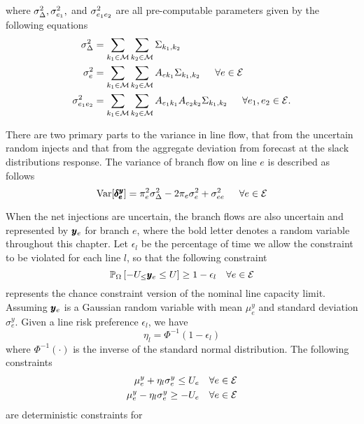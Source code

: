 where  $\sigma_\Delta^2, \sigma_{e_1}^2,$ and $\sigma_{e_1 e_2}^2$ are all pre-computable parameters given by the following equations
\begin{subequations}
\begin{align}
 \sD &= \sko \skt \sigot  \\
 \sigma^2_e &= \sko \skt A_{ek_1} \sigot   \hspace{15px} \forall e \in \cE\\
 \seealone &= \sko \skt A_{e_1 k_1} A_{e_2 k_2} \sigot \hspace{15px} \forall e_1,e_2 \in \cE.
\end{align}
\end{subequations}



There are two primary parts to the variance in line flow, that from the uncertain random injects and that from the aggregate deviation from forecast at the slack distributions response.  The variance of branch flow on line $e$ is described as follows  
\begin{equation}
\operatorname{Var}[ \rdfe ] =  \pi_e^2  \sD  - 2 \pi_e \sigma^2_e  + \sigma^2_{e e}  \hspace{15px} \forall e \in \cE
\end{equation}



When the net injections are uncertain, the branch flows are also uncertain and represented by $\pmb{y}_e$ for branch $e$, where the bold letter denotes a random variable throughout this chapter.  Let $\epsilon_l$ be the percentage of time we allow the constraint to be violated for each line $l$, so that the following constraint 
\begin{equation}\label{eq_cc}
 \bP{\Omega}{  -U_ \leq  \ry_e \leq U } \geq 1- \epsilon_l \hspace{10px} \forall e \in \cE
\end{equation}
represents the chance constraint version of the nominal line capacity limit.  Assuming $\pmb{y}_e$ is a Gaussian random variable with mean $\mu^y_e$ and standard deviation $\sigma^y_e$. Given a line risk preference $\epsilon_l$, we have 
\begin{equation}\label{etaequation}
\eta_l = \Phi^{-1}\left(1-\epsilon_l\right)
\end{equation}
 where $\Phi^{-1} ( \cdot )$ is the inverse of the standard normal distribution. The following constraints
\begin{align*}
 \mu^y_e + \eta_l \sigma^y_e \leq U_e  \hspace{10px} \forall e \in \cE \\
 \mu^y_e - \eta_l \sigma^y_e \geq -U_e  \hspace{10px} \forall e \in \cE
\end{align*}
are deterministic constraints for 

